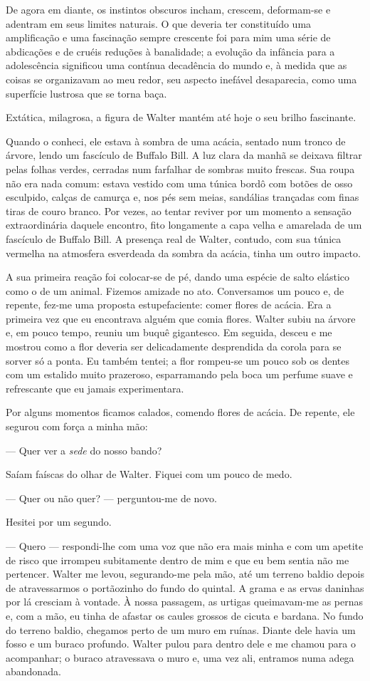 De agora em diante, os instintos obscuros incham, crescem, deformam-se e adentram em seus limites naturais. O que deveria ter constituído uma amplificação e uma fascinação sempre crescente foi para mim uma série de abdicações e de cruéis reduções à banalidade; a evolução da infância para a adolescência significou uma contínua decadência do mundo e, à medida que as coisas se organizavam ao meu redor, seu aspecto inefável desaparecia, como uma superfície lustrosa que se torna baça.

Extática, milagrosa, a figura de Walter mantém até hoje o seu brilho fascinante.

Quando o conheci, ele estava à sombra de uma acácia, sentado num tronco de árvore, lendo um fascículo de Buffalo Bill.  A luz clara da manhã se deixava filtrar pelas folhas verdes, cerradas num farfalhar de sombras muito frescas. Sua roupa não era nada comum: estava vestido com uma túnica bordô com botões de osso esculpido, calças de camurça e, nos pés sem meias, sandálias trançadas com finas tiras de couro branco. Por vezes, ao tentar reviver por um momento a sensação extraordinária daquele encontro, fito longamente a capa velha e amarelada de um fascículo de Buffalo Bill. A presença real de Walter, contudo, com sua túnica vermelha na atmosfera esverdeada da sombra da acácia, tinha um outro impacto.

A sua primeira reação foi colocar-se de pé, dando uma espécie de salto elástico como o de um animal. Fizemos amizade no ato. Conversamos um pouco e, de repente, fez-me uma proposta estupefaciente: comer flores de acácia. Era a primeira vez que eu encontrava alguém que comia flores. Walter subiu na árvore e, em pouco tempo, reuniu um buquê gigantesco. Em seguida, desceu e me mostrou como a flor deveria ser delicadamente desprendida da corola para se sorver só a ponta. Eu também tentei; a flor rompeu-se um pouco sob os dentes com um estalido muito prazeroso, esparramando pela boca um perfume suave e refrescante que eu jamais experimentara.

Por alguns momentos ficamos calados, comendo flores de acácia. De repente, ele segurou com força a minha mão: 

--- Quer ver a \textit{sede} do nosso bando?

Saíam faíscas do olhar de Walter. Fiquei com um pouco de medo. 

--- Quer ou não quer? --- perguntou-me de novo. 

Hesitei por um segundo. 

--- Quero --- respondi-lhe com uma voz que não era mais minha e com um apetite de risco que irrompeu subitamente dentro de mim e que eu bem sentia não me pertencer.
Walter me levou, segurando-me pela mão, até um terreno baldio depois de atravessarmos o portãozinho do fundo do quintal. A grama e as ervas daninhas por lá cresciam à vontade. À nossa passagem, as urtigas queimavam-me as pernas e, com a mão, eu tinha de afastar os caules grossos de cicuta e bardana. No fundo do terreno baldio, chegamos perto de um muro em ruínas. Diante dele havia um fosso e um buraco profundo. Walter pulou para dentro dele e me chamou para o acompanhar; o buraco atravessava o muro e, uma vez ali, entramos numa adega abandonada.

